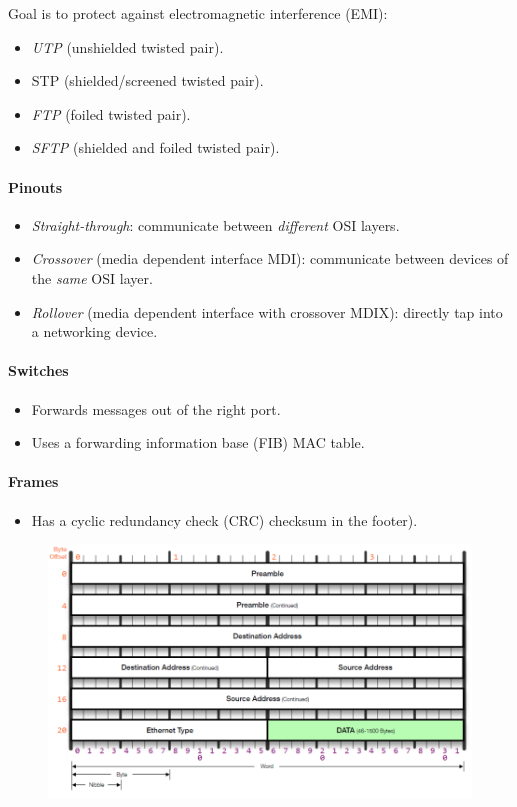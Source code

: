 \documentclass[twocolumn,english]{article}
\begin{document}
Goal is to protect against electromagnetic interference (EMI):
\begin{itemize}
\item \emph{UTP} (unshielded twisted pair).
\item STP (shielded/screened twisted pair).
\item \emph{FTP} (foiled twisted pair).
\item \emph{SFTP} (shielded and foiled twisted pair).
\end{itemize}

\paragraph{Pinouts}
\begin{itemize}
\item \emph{Straight-through}: communicate between \emph{different} OSI
layers.
\item \emph{Crossover} (media dependent interface MDI): communicate between
devices of the \emph{same} OSI layer.
\item \emph{Rollover} (media dependent interface with crossover MDIX): directly
tap into a networking device.
\end{itemize}

\paragraph{Switches}
\begin{itemize}
\item Forwards messages out of the right port.
\item Uses a forwarding information base (FIB) MAC table.
\end{itemize}

\paragraph{Frames}
\begin{itemize}
\item Has a cyclic redundancy check (CRC) checksum in the footer).
\end{itemize}
\begin{figure}[H]
\centering{}\includegraphics[width=0.75\linewidth]{img/ethernet}
\end{figure}
\end{document}

